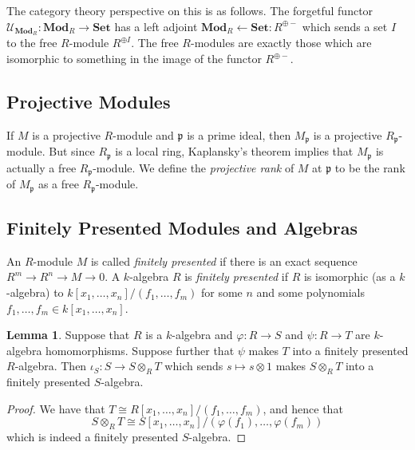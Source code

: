 \documentclass[oneside,11pt]{amsart}
\newcommand{\bSet}{\ensuremath{\textbf{Set}}}
\newcommand{\bMod}{\ensuremath{\textbf{Mod}}}
\newcommand{\mU}{\ensuremath{\mathcal{U}}}
\newcommand{\fp}{\ensuremath{\mathfrak{p}}}
\theoremstyle{definition}
\newtheorem{proof techniques}{Proof Techniques}
\newtheorem{lemma}{Lemma}
\begin{document}
The category theory perspective on this is as follows. The forgetful functor $\mU_{\bMod_R} : \bMod_R \to \bSet$ has a left adjoint $\bMod_R \leftarrow \bSet : R^{\oplus -}$ which sends a set $I$ to the free $R$-module $R^{\oplus I}$. The free $R$-modules are exactly those which are isomorphic to something in the image of the functor $R^{\oplus -}$. 


\subsection{Projective Modules}

If $M$ is a projective $R$-module and $\fp$ is a prime ideal, then $M_\fp$ is a projective $R_\fp$-module. But since $R_\fp$ is a local ring, Kaplansky's theorem \cite{kaplansky1958} implies that $M_\fp$ is actually a free $R_\fp$-module. We define the \emph{projective rank} of $M$ at $\fp$ to be the rank of $M_\fp$ as a free $R_\fp$-module. 



\subsection{Finitely Presented Modules and Algebras}

An $R$-module $M$ is called \emph{finitely presented} if there is an exact sequence $R^m \to R^n \to M \to 0$. A $k$-algebra $R$ is \emph{finitely presented} if $R$ is isomorphic (as a $k$-algebra) to $k[x_1, \ldots, x_n] / (f_1, \ldots, f_m)$ for some $n$ and some polynomials $f_1, \ldots, f_m \in k[x_1, \ldots, x_n]$. 

\begin{lemma}\label{lem: finitely presented is preserved by pushouts}
Suppose that $R$ is a $k$-algebra and $\varphi : R \to S$ and $\psi : R \to T$ are $k$-algebra homomorphisms. Suppose further that $\psi$ makes $T$ into a finitely presented $R$-algebra. Then $\iota_S : S \to S \otimes_R T$ which sends $s \mapsto s \otimes 1$ makes $S \otimes_R T$ into a finitely presented $S$-algebra. 
\end{lemma}

\begin{proof}
We have that $T \cong R[x_1, \ldots, x_n] / (f_1, \ldots, f_m)$, and hence that 
\begin{equation*}
S \otimes_R T \cong S[x_1, \ldots, x_n] / (\varphi(f_1), \ldots, \varphi(f_m))
\end{equation*} 
which is indeed a finitely presented $S$-algebra. 
\end{proof}
\end{document}
